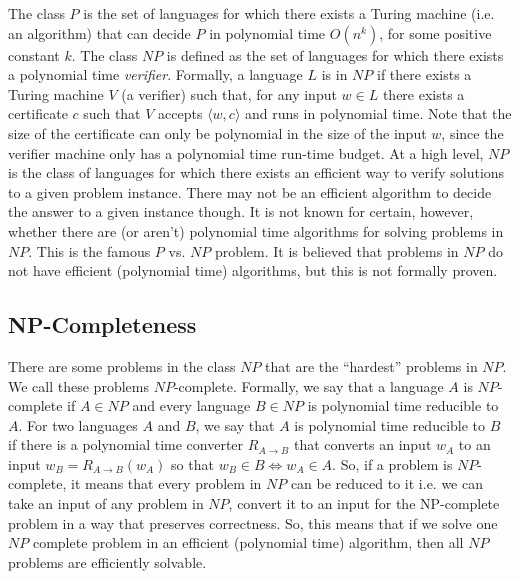 \documentclass[10pt,a4paper]{article}
\begin{document}
The class $P$ is the set of languages for which there exists a Turing machine (i.e. an algorithm) that can decide $P$ in polynomial time $O(n^k)$, for some positive constant $k$. The class $NP$ is defined as the set of languages for which there exists a polynomial time \textit{verifier}. Formally, a language $L$ is in $NP$ if there exists a Turing machine $V$ (a verifier) such that, for any input $w \in L$ 
there exists a certificate $c$ such that $V$ accepts $\langle w,c \rangle$ and runs in polynomial time. Note that the size of the certificate can only be polynomial in the size of the input $w$, since the verifier machine only has a polynomial time run-time budget. At a high level, $NP$ is the class of languages for which there exists an efficient way to verify solutions to a given problem instance. There may not be an efficient algorithm to decide the answer to a given instance though. It is not known for certain, however, whether there are (or aren't) polynomial time algorithms for solving problems in $NP$. This is the famous $P$ vs. $NP$ problem. It is believed that problems in $NP$ do not have efficient (polynomial time) algorithms, but this is not formally proven. 

\subsection{NP-Completeness}

There are some problems in the class $NP$ that are the ``hardest'' problems in $NP$. We call these problems $NP$-complete. Formally, we say that a language $A$ is $NP$-complete if $A \in NP$ and every language $B \in NP$ is polynomial time reducible to $A$. For two languages $A$ and $B$, we say that $A$ is polynomial time reducible to $B$ if there is a polynomial time converter $R_{A\rightarrow B}$ that converts an input $w_A$ to an input $w_B = R_{A\rightarrow B}(w_A)$ so that $w_B \in B \iff w_A \in A$. So, if a problem is $NP$-complete, it means that every problem in $NP$ can be reduced to it i.e. we can take an input of any problem in $NP$, convert it to an input for the NP-complete problem in a way that preserves correctness. So, this means that if we solve one $NP$ complete problem in an efficient (polynomial time) algorithm, then all $NP$ problems are efficiently solvable. 
\end{document}
